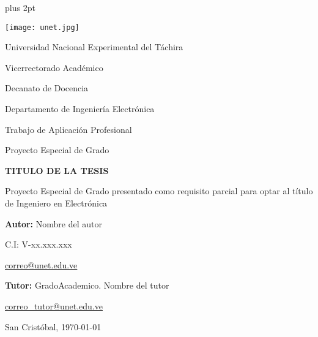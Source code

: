 \begin{titlepage}
	\parskip=7.25pt plus 2pt
	\setcounter{page}{2}
	\begin{center}
		\texttt{[image: unet.jpg]}
		
		Universidad Nacional Experimental del Táchira 
		
		Vicerrectorado Académico
		
		Decanato de Docencia
		
		Departamento de Ingeniería Electrónica
		
		Trabajo de Aplicación Profesional
		
		Proyecto Especial de Grado
	\end{center}

	\centering
	\vspace{2cm}
	\vfill
	{\Large \textbf{TITULO DE LA TESIS}\par}
	\vspace{10pt}
	{\large Proyecto Especial de Grado presentado como requisito parcial para optar al título de Ingeniero en Electrónica}

	\vfill
	\begin{flushright}
		\begin{spacing}{1.5}
			\textbf{Autor:} Nombre del autor
			
			C.I: V-xx.xxx.xxx
			
			\href{correo@unet.edu.ve}{correo@unet.edu.ve}
			
			\textbf{Tutor:} GradoAcademico. Nombre del tutor
			
			\href{correo\_tutor@unet.edu.ve}{correo\_tutor@unet.edu.ve}
		\end{spacing}	
	\end{flushright}

	\vfill
		San Cristóbal, \monthyeardate\today
	\leavevmode
\end{titlepage}
